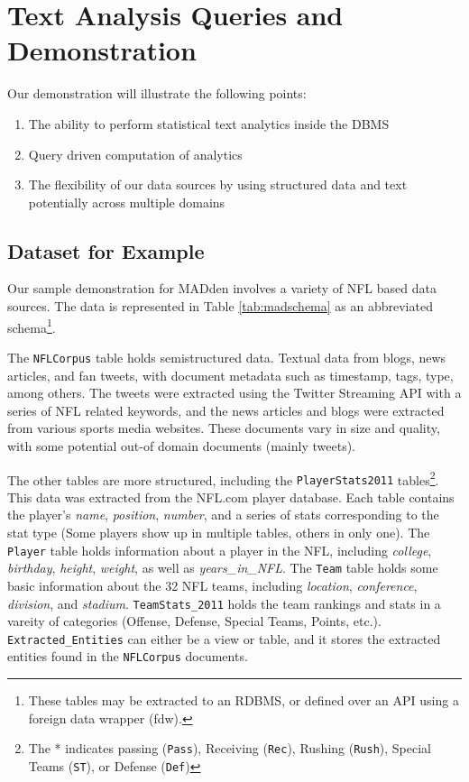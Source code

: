 \section{Text Analysis Queries and Demonstration}
Our demonstration will illustrate the following points: 
\begin{enumerate}[noitemsep]
  \item The ability to perform statistical text analytics inside the DBMS
  \item Query driven computation of analytics
  \item The flexibility of our data sources by using structured data and text
  potentially across multiple domains
\end{enumerate} 
\subsection{Dataset for Example}
Our sample demonstration for MADden involves a variety of NFL based data sources. 
The data is represented in Table \ref{tab:madschema} as an abbreviated
schema\footnote{These tables may be extracted to an RDBMS, or defined over an
API using a foreign data wrapper (fdw).}.

The {\tt NFLCorpus} table holds semistructured data. Textual data from blogs,
news articles, and fan tweets, with document metadata such as timestamp, tags,
type, among others. The tweets were extracted using the Twitter Streaming API
with a series of NFL related keywords, and the news articles and blogs were
extracted from various sports media websites. These documents vary in size and
quality, with some potential out-of domain documents (mainly tweets).

The other tables are more structured,
including the {\tt PlayerStats2011} tables\footnote{The * indicates passing ({\tt Pass}),
Receiving ({\tt Rec}), Rushing ({\tt Rush}), Special Teams ({\tt ST}), or
Defense ({\tt Def})\label{fn:playerstats}}.
This data was extracted from the NFL.com player database. Each table contains
the player's \textit{name}, \textit{position}, \textit{number}, and a series of
stats corresponding to the stat type (Some players show up in multiple tables, others in only one). The
{\tt Player} table holds information about a player in the NFL, including
\textit{college}, \textit{birthday}, \textit{height}, \textit{weight}, as well
as \textit{years\_in\_NFL}. The {\tt Team} table holds some basic information
about the 32 NFL teams, including \textit{location}, \textit{conference}, \textit{division}, and \textit{stadium}.
{\tt TeamStats\_2011} holds the team rankings and stats in a vareity of categories (Offense, Defense, Special Teams,
Points, etc.).
{\tt Extracted\_Entities} can either be a view or table, and it stores the
extracted entities found in the {\tt NFLCorpus} documents.

